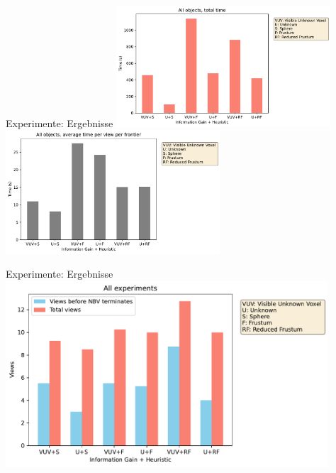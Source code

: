 \documentclass{beamer}
\begin{document}
\begin{frame}{Experimente: Ergebnisse}
	\centering
	\includegraphics[width=0.6\textwidth]{Graphics/all_total_times.pdf}
	\includegraphics[width=0.6\textwidth]{Graphics/all_avg_times_frontiers.pdf}
\end{frame}

\begin{frame}{Experimente: Ergebnisse}
	\centering
	\includegraphics[width=0.9\textwidth]{Graphics/all_num_views.pdf}
\end{frame}
\end{document}
